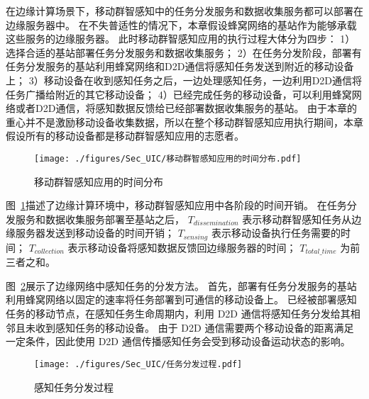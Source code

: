 在边缘计算场景下，移动群智感知中的任务分发服务和数据收集服务都可以部署在边缘服务器中。
在不失普适性的情况下，本章假设蜂窝网络的基站作为能够承载这些服务的边缘服务器。
此时移动群智感知应用的执行过程大体分为四步：
1）选择合适的基站部署任务分发服务和数据收集服务；
2）在任务分发阶段，部署有任务分发服务的基站利用蜂窝网络和D2D通信将感知任务发送到附近的移动设备上；
3）移动设备在收到感知任务之后，一边处理感知任务，一边利用D2D通信将任务广播给附近的其它移动设备；
4）已经完成任务的移动设备，可以利用蜂窝网络或者D2D通信，将感知数据反馈给已经部署数据收集服务的基站。
由于本章的重心并不是激励移动设备收集数据，所以在整个移动群智感知应用执行期间，本章假设所有的移动设备都是移动群智感知应用的志愿者。

\begin{figure}[!h]
  \centering
  \vspace{-1em}
  \texttt{[image: ./figures/Sec\_UIC/移动群智感知应用的时间分布.pdf]}
  \vspace{-0.5em}
  \caption{移动群智感知应用的时间分布}
  \vspace{-1em}
  \label{Figure_MCS_Delay}
\end{figure}

图~\ref{Figure_MCS_Delay}描述了边缘计算环境中，移动群智感知应用中各阶段的时间开销。
在任务分发服务和数据收集服务部署至基站之后，
$T_{dissemination}$ 表示移动群智感知任务从边缘服务器发送到移动设备的时间开销；
$T_{sensing}$ 表示移动设备执行任务需要的时间；
$T_{collection}$ 表示移动设备将感知数据反馈回边缘服务器的时间；
$T_{total\_time}$ 为前三者之和。


图~\ref{Figure_PropagationProcedure}展示了边缘网络中感知任务的分发方法。
首先，部署有任务分发服务的基站利用蜂窝网络以固定的速率将任务部署到可通信的移动设备上。
已经被部署感知任务的移动节点，在感知任务生命周期内，利用 D2D 通信将感知任务分发给其相邻且未收到感知任务的移动设备。
由于 D2D 通信需要两个移动设备的距离满足一定条件，因此使用 D2D 通信传播感知任务会受到移动设备运动状态的影响。

\begin{figure}[!h]
  \centering
  \texttt{[image: ./figures/Sec\_UIC/任务分发过程.pdf]}
  \vspace{-0.5em}
  \caption{感知任务分发过程}
  \vspace{-1em}
  \label{Figure_PropagationProcedure}
\end{figure}

